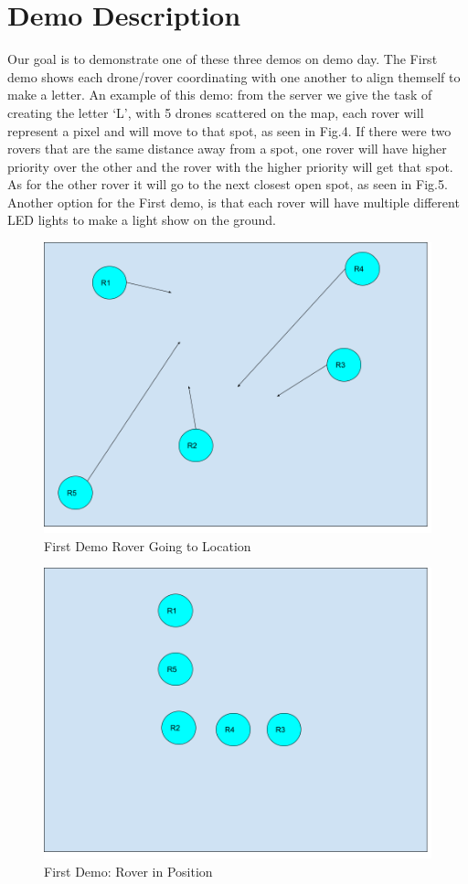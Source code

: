 \documentclass[conference]{IEEEtran}
\begin{document}
\section{Demo Description} 
Our goal is to demonstrate one of these three demos on demo day. The First demo shows each drone/rover coordinating with one another to align themself to make a letter. An example of this demo: from the server we give the task of creating the letter ‘L’, with 5 drones scattered on the map, each rover will represent a pixel and will move to that spot, as seen in Fig.4. If there were two rovers that are the same distance away from a spot, one rover will have higher priority over the other and the rover with the higher priority will get that spot. As for the other rover it will go to the next closest open spot, as seen in Fig.5. Another option for the First demo, is that each rover will have multiple different LED lights to make a light show on the ground.
\begin{figure}[!h]
	\includegraphics[width=\linewidth]{demo_1_L.png}
	\caption{First Demo Rover Going to Location}
\end{figure}
\begin{figure}[!h]
	\includegraphics[width=\linewidth]{demo_1_2L.png}
	\caption{First Demo: Rover in Position}
\end{figure}
\end{document}

